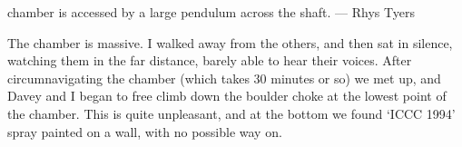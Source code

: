 \begin{marginfigure}
\label{Ta Mokra}
\caption{   \protect{} chamber is accessed by a large pendulum across the \protect{} shaft. --- Rhys Tyers}
\end{marginfigure}

The chamber is massive. I walked away from the others, and then sat in silence, watching them in the far distance, barely able to hear their voices. After circumnavigating the chamber (which takes 30 minutes or so) we met up, and Davey and I began to free climb down the boulder choke at the lowest point of the chamber. This is quite unpleasant, and at the bottom we found `ICCC 1994' spray painted on a wall, with no possible way on.

